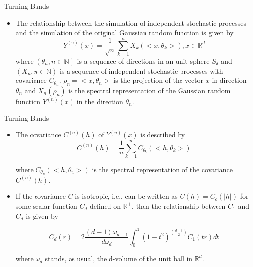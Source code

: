 \begin{frame}{Turning Bands}
\begin{itemize}
 \item The relationship between the simulation of independent stochastic processes and the simulation of the original Gaussian random function is given by 
 \begin{equation}
  Y^{(n)}(x) = \frac{1}{\sqrt{n}} \sum_{k=1}^{n} X_k(<x,\theta_k>), x \in \mathbb{R}^d
 \end{equation}
 where $(\theta_n, n \in \mathbb{N})$ is a sequence of directions in an unit sphere $S_d$ and $(X_n, n \in \mathbb{N})$ is a sequence of
 independent stochastic processes with covariance $C_{\theta_n}$. $\rho_n = <x, \theta_n>$ is the projection of the vector
 $x$ in direction $\theta_n$ and $X_n(\rho_n)$ is the spectral representation of the Gaussian random function $Y^{(n)}(x)$ in
 the direction $\theta_n$.
\end{itemize}
\end{frame}

\begin{frame}{Turning Bands}
\begin{itemize}
\item The covariance $C^{(n)}(h)$ of $Y^{(n)}(x)$ is described by
\begin{equation}
C^{(n)}(h) = \frac{1}{n} \sum_{k=1}^{n} C_{\theta_k}(<h, \theta_k>)
\end{equation}

where $C_{\theta_n}(<h, \theta_n>)$ is the spectral representation of the covariance $C^{(n)}(h)$.

\item If the covariance $C$ is isotropic, i.e., can be written as $C(h)=C_d(|h|)$ for some scalar function $C_d$ defined on 
$\mathbb{R}^{+}$, then the relationship between $C_1$ and $C_d$ is given by

\begin{equation}\label{eq_cov_d}
 C_d(r) = 2 \frac{(d-1)\omega_{d-1}}{d\omega_{d}} \int_{0}^{1}(1-t^2)^(\frac{d-3}{2})C_1(tr) dt
\end{equation}

where $\omega_{d}$ stands, as usual, the d-volume of the unit ball in $\mathbb{R}^d$. 
\end{itemize}
\end{frame}


